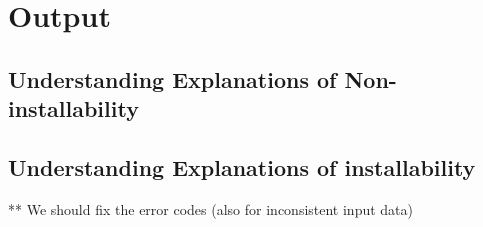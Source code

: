 \section{Output}
\label{sec:output}

\subsection{Understanding Explanations of Non-installability}

\subsection{Understanding Explanations of installability} 

** We should fix the error codes (also for inconsistent input data)

